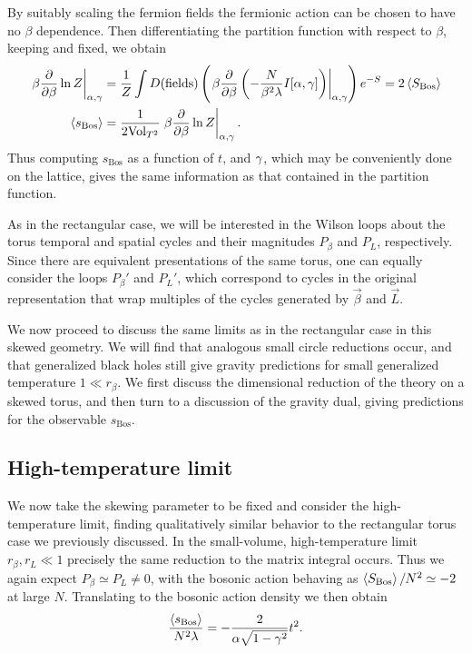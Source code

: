 By suitably scaling the fermion fields the fermionic action can be chosen to have no $\beta$ dependence.
Then differentiating the partition function with respect to $\beta$, keeping \al and \ga fixed, we obtain
\begin{align}
  \left. \beta \frac{\partial }{\partial \beta} \ln Z \right|_{\alpha, \gamma} & = \frac{1}{Z} \int D(\text{fields}) \left(\left. \beta \frac{\partial }{\partial \beta} \left(-\frac{N}{\beta^2 \lambda} I[\alpha, \gamma]\right) \right|_{\alpha, \gamma}\right) e^{-S} = 2\left\langle S_{\text{Bos}} \right\rangle \\
  \left\langle s_{\text{Bos}} \right\rangle & = \frac{1}{2 \text{Vol}_{T^2}} \left. \beta \frac{\partial }{\partial \beta} \ln Z \right|_{\alpha, \gamma}.                                                                                                             \label{bosonicaction}
\end{align}
Thus computing $s_{\text{Bos}}$ as a function of $t$, \al and $\gamma$, which may be conveniently done on the lattice, gives the same information as that contained in the partition function.

As in the rectangular case, we will be interested in the Wilson loops about the torus temporal and spatial cycles and their magnitudes $P_{\beta}$ and $P_L$, respectively.
Since there are equivalent presentations of the same torus, one can equally consider the loops $P_{\beta}'$ and $P_L'$, which correspond to cycles in the original representation that wrap multiples of the cycles generated by $\vec{\beta}$ and $\vec{L}$.

We now proceed to discuss the same limits as in the rectangular case in this skewed geometry.
We will find that analogous small circle reductions occur, and that generalized black holes still give gravity predictions for small generalized temperature $1 \ll r_{\beta}$.
We first discuss the dimensional reduction of the theory on a skewed torus, and then turn to a discussion of the gravity dual, giving predictions for the observable $s_{\text{Bos}}$.

\subsection{\label{sec:smallcircle}High-temperature limit}
We now take the skewing parameter \ga to be fixed and consider the high-temperature limit, finding qualitatively similar behavior to the rectangular torus case we previously discussed.
In the small-volume, high-temperature limit $r_{\beta}, r_L \ll 1$ precisely the same reduction to the matrix integral occurs.
Thus we again expect $P_{\beta} \simeq P_L \ne 0$, with the bosonic action behaving as $\left\langle S_{\text{Bos}} \right\rangle / N^2 \simeq -2$ at large $N$.
Translating to the bosonic action density we then obtain
\begin{equation}
  \label{eq:HT}
  \frac{\left\langle s_{\text{Bos}} \right\rangle}{N^2 \lambda} = -\frac{2}{\alpha \sqrt{1 - \gamma^2}} t^2.
\end{equation}

